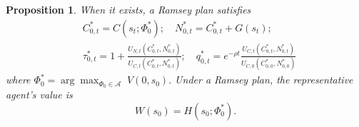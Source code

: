 \documentclass[12pt]{article}
\newtheorem{proposition}{Proposition}
\begin{document}
\begin{proposition} \label{propbellman} 
	When it exists, a Ramsey plan satisfies
	\begin{eqnarray*}
		& C_{0, t}^{*}  =  C(s_t; \Phi_{0}^{*}); \quad 
		N_{0, t}^{*}  =  C_{0, t}^{*}+G(s_t) ;  \\
		& 	\tau_{0, t}^{*}   =   1+\frac{U_{N, t}(C_{0, t}^{*}, N_{0, t}^{*})}{U_{C, t}(C_{0, t}^{*}, N_{0, t}^{*})}; \quad
		q^*_{0,t}  = 
		e^{-\rho t}\frac{U_{C, t}(C_{0, t}^{*}, N_{0, t}^{*})}{U_{C, 0}(C_{0, 0}^{*}, N_{0, 0}^{*})}
	\end{eqnarray*}
	where $\Phi_{0}^*= \arg\max_{\Phi_0\in \mathcal A} \; V(0, s_0).$ Under a Ramsey plan, %
	the representative agent's value  is 
	\begin{equation}
		W(s_0) = H(s_0; \Phi_0^*).
	\end{equation}
\end{proposition}
\end{document}
